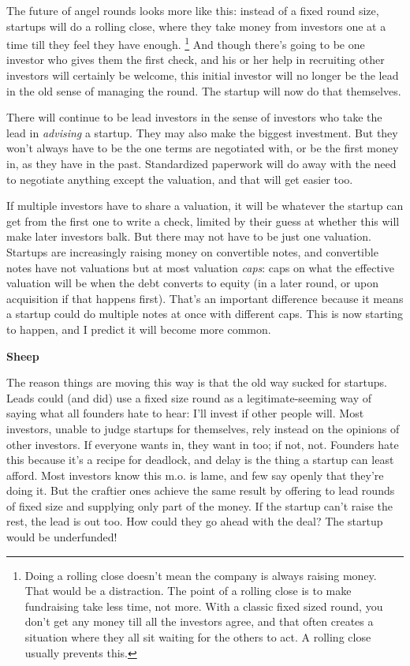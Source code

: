 \documentclass[12pt]{book}
\begin{document}
The future of angel rounds looks more like this: instead of a fixed
round size, startups will do a rolling close, where they take money from
investors one at a time till they feel they have enough.
\footnote{Doing a rolling close doesn't mean the company is always raising
money. That would be a distraction. The point of a rolling close is to
make fundraising take less time, not more. With a classic fixed sized
round, you don't get any money till all the investors agree, and that
often creates a situation where they all sit waiting for the others to
act. A rolling close usually prevents this.} And though there's going to be one investor who
gives them the first check, and his or her help in recruiting other
investors will certainly be welcome, this initial investor will no
longer be the lead in the old sense of managing the round. The startup
will now do that themselves.

There will continue to be lead investors in the sense of investors who
take the lead in \emph{advising} a startup. They may also make the
biggest investment. But they won't always have to be the one terms are
negotiated with, or be the first money in, as they have in the past.
Standardized paperwork will do away with the need to negotiate anything
except the valuation, and that will get easier too.

If multiple investors have to share a valuation, it will be whatever the
startup can get from the first one to write a check, limited by their
guess at whether this will make later investors balk. But there may not
have to be just one valuation. Startups are increasingly raising money
on convertible notes, and convertible notes have not valuations but at
most valuation \emph{caps}: caps on what the effective valuation will be
when the debt converts to equity (in a later round, or upon acquisition
if that happens first). That's an important difference because it means
a startup could do multiple notes at once with different caps. This is
now starting to happen, and I predict it will become more common.

\textbf{Sheep}

The reason things are moving this way is that the old way sucked for
startups. Leads could (and did) use a fixed size round as a
legitimate-seeming way of saying what all founders hate to hear: I'll
invest if other people will. Most investors, unable to judge startups
for themselves, rely instead on the opinions of other investors. If
everyone wants in, they want in too; if not, not. Founders hate this
because it's a recipe for deadlock, and delay is the thing a startup can
least afford. Most investors know this m.o. is lame, and few say openly
that they're doing it. But the craftier ones achieve the same result by
offering to lead rounds of fixed size and supplying only part of the
money. If the startup can't raise the rest, the lead is out too. How
could they go ahead with the deal? The startup would be underfunded!
\end{document}
